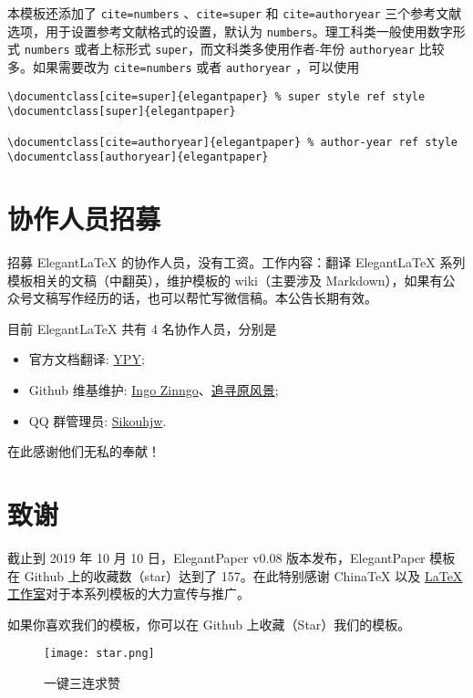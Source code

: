\documentclass[lang=cn,11pt,authoryear,a4paper]{elegantpaper}
\begin{document}
本模板还添加了 \lstinline{cite=numbers} 、\lstinline{cite=super} 和 \lstinline{cite=authoryear}  三个参考文献选项，用于设置参考文献格式的设置，默认为 \lstinline{numbers}。理工科类一般使用数字形式 \lstinline{numbers} 或者上标形式 \lstinline{super}，而文科类多使用作者-年份 \lstinline{authoryear} 比较多。如果需要改为 \lstinline{cite=numbers}  或者  \lstinline{authoryear} ，可以使用
\begin{lstlisting}
\documentclass[cite=super]{elegantpaper} % super style ref style
\documentclass[super]{elegantpaper}

\documentclass[cite=authoryear]{elegantpaper} % author-year ref style
\documentclass[authoryear]{elegantpaper}
\end{lstlisting}


\section{协作人员招募}
招募 Elegant\LaTeX{} 的协作人员，没有工资。工作内容：翻译 Elegant\LaTeX{} 系列模板相关的文稿（中翻英），维护模板的 wiki（主要涉及 Markdown），如果有公众号文稿写作经历的话，也可以帮忙写微信稿。本公告长期有效。

目前 ElegantLaTeX 共有 4 名协作人员，分别是
\begin{itemize}
  \item 官方文档翻译: \href{https://github.com/peggy2006xzyz}{YPY};
  \item Github 维基维护: \href{https://github.com/izinngo}{Ingo Zinngo}、\href{https://github.com/xiaohao890809}{追寻原风景};
  \item QQ 群管理员: \href{https://github.com/sikouhjw}{Sikouhjw}.
\end{itemize}

在此感谢他们无私的奉献！


\section{致谢}
截止到 2019 年 10 月 10 日，ElegantPaper v0.08 版本发布，ElegantPaper 模板在 Github 上的收藏数（star）达到了 157。在此特别感谢 China\TeX{} 以及 \href{http://www.latexstudio.net/}{\LaTeX{} 工作室}对于本系列模板的大力宣传与推广。

如果你喜欢我们的模板，你可以在 Github 上收藏（Star）我们的模板。
\begin{figure}[htbp]
  \centering
  \texttt{[image: star.png]}
  \caption{一键三连求赞}
\end{figure}
\end{document}
